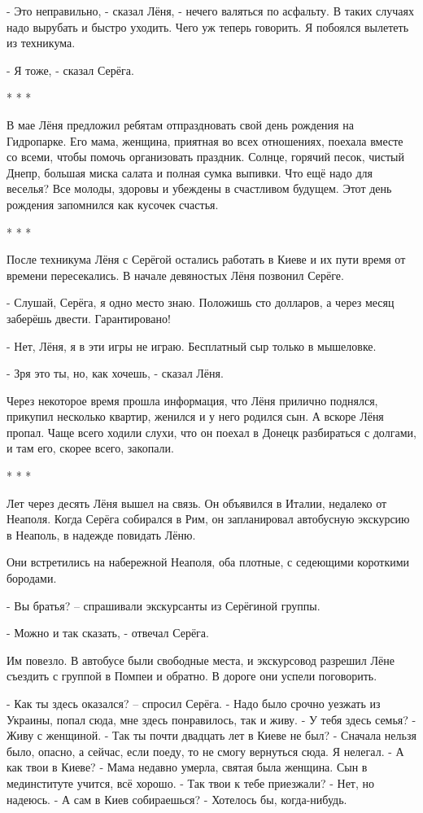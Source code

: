 - Это неправильно, - сказал Лёня, - нечего валяться по асфальту. В таких
случаях надо вырубать и быстро уходить. Чего уж теперь говорить. Я побоялся
вылететь из техникума.

- Я тоже, - сказал Серёга.

* * *

В мае Лёня предложил ребятам отпраздновать свой день рождения на Гидропарке.
Его мама, женщина, приятная во всех отношениях, поехала вместе со всеми, чтобы
помочь организовать праздник. Солнце, горячий песок, чистый Днепр, большая
миска салата и полная сумка выпивки. Что ещё надо для веселья? Все молоды,
здоровы и убеждены в счастливом будущем. Этот день рождения запомнился как
кусочек счастья.

* * *

После техникума Лёня с Серёгой остались работать в Киеве и их пути время от
времени пересекались. В начале девяностых Лёня позвонил Серёге.

- Слушай, Серёга, я одно место знаю. Положишь сто долларов, а через месяц
заберёшь двести. Гарантировано!

- Нет, Лёня, я в эти игры не играю. Бесплатный сыр только в мышеловке.

- Зря это ты, но, как хочешь, - сказал Лёня.

Через некоторое время прошла информация, что Лёня прилично поднялся, прикупил
несколько квартир, женился и у него родился сын. А вскоре Лёня пропал. Чаще
всего ходили слухи, что он поехал в Донецк разбираться с долгами, и там его,
скорее всего, закопали.

* * *

Лет через десять Лёня вышел на связь. Он объявился в Италии, недалеко от
Неаполя. Когда Серёга собирался в Рим, он запланировал автобусную экскурсию в
Неаполь, в надежде повидать Лёню.

Они встретились на набережной Неаполя, оба плотные, с седеющими короткими
бородами.

- Вы братья? – спрашивали экскурсанты из Серёгиной группы.

- Можно и так сказать, - отвечал Серёга.

Им повезло. В автобусе были свободные места, и экскурсовод разрешил Лёне
съездить с группой в Помпеи и обратно. В дороге они успели поговорить.

\obeycr
- Как ты здесь оказался? – спросил Серёга.
- Надо было срочно уезжать из Украины, попал сюда, мне здесь понравилось, так и живу.
- У тебя здесь семья?
- Живу с женщиной.
- Так ты почти двадцать лет в Киеве не был?
- Сначала нельзя было, опасно, а сейчас, если поеду, то не смогу вернуться сюда. Я нелегал.
- А как твои в Киеве?
- Мама недавно умерла, святая была женщина. Сын в мединституте учится, всё хорошо.
- Так твои к тебе приезжали?
- Нет, но надеюсь.
- А сам в Киев собираешься?
- Хотелось бы, когда-нибудь.
\restorecr

